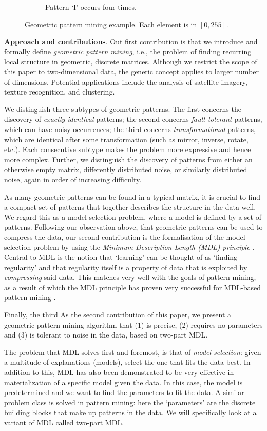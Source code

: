 \documentclass{llncs}
\begin{document}
\begin{figure}[t]
\begin{subfigure}[t]{0.37\textwidth}
\caption{Pattern `I' occurs four times.}
\label{fig-example1c}
\end{subfigure}%
\caption{Geometric pattern mining example. Each element is in $[0,255]$.}
\label{fig-example1}
\end{figure}  

\smallskip
\noindent \textbf{Approach and contributions}. Out first contribution is that we introduce and formally define \emph{geometric pattern mining}, i.e., the problem of finding recurring local structure in geometric, discrete matrices. Although we restrict the scope of this paper to two-dimensional data, the generic concept applies to larger number of dimensions. Potential applications include the analysis of satellite imagery, texture recognition, and clustering.

We distinguish three subtypes of geometric patterns. The first concerns the discovery of \emph{exactly identical} patterns; the second concerns \emph{fault-tolerant} patterns, which can have noisy occurrences; the third concerns \emph{transformational} patterns, which are identical after some transformation (such as mirror, inverse, rotate, etc.). Each consecutive subtype makes the problem more expressive and hence more complex. Further, we distinguish the discovery of patterns from either an otherwise empty matrix, differently distributed noise, or similarly distributed noise, again in order of increasing difficulty.

As many geometric patterns can be found in a typical matrix, it is crucial to find a compact set of patterns that together describes the structure in the data well. We regard this as a model selection problem, where a model is defined by a set of patterns. Following our observation above, that geometric patterns can be used to compress the data, our second contribution is the formalisation of the model selection problem by using the \emph{Minimum Description Length (MDL) principle} \cite{rissanenmdl,grunwaldmdl}. Central to MDL is the notion that `learning' can be thought of as `finding regularity' and that regularity itself is a property of data that is exploited by \emph{compressing} said data. This matches very well with the goals of pattern mining, as a result of which the MDL principle has proven very successful for MDL-based pattern mining \cite{krimp,classy}.

Finally, the third
As the second contribution of this paper, we present a geometric pattern mining algorithm that (1) is precise, (2) requires no parameters and (3) is tolerant to noise in the data, based on two-part MDL.

The problem that MDL solves first and foremost, is that of \emph{model selection}: given a multitude of explanations (models), select the one that fits the data best. In addition to this, MDL has also been demonstrated to be very effective in materialization of a specific model given the data. In this case, the model is predetermined and we want to find the parameters to fit the data. A similar problem class is solved in pattern mining: here the `parameters' are the discrete building blocks that make up patterns in the data. We will specifically look at a variant of MDL called two-part MDL. 
\end{document}
